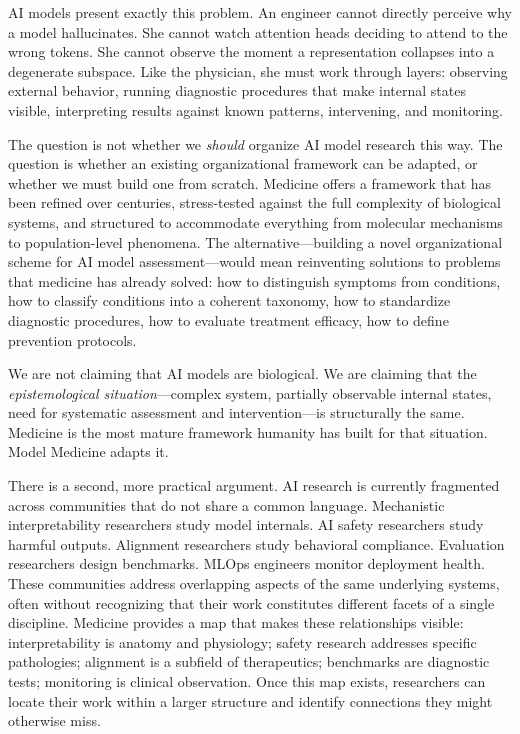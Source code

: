 \documentclass[11pt]{article}
\begin{document}
AI models present exactly this problem. An engineer cannot directly perceive why a model hallucinates. She cannot watch attention heads deciding to attend to the wrong tokens. She cannot observe the moment a representation collapses into a degenerate subspace. Like the physician, she must work through layers: observing external behavior, running diagnostic procedures that make internal states visible, interpreting results against known patterns, intervening, and monitoring.

The question is not whether we \emph{should} organize AI model research this way. The question is whether an existing organizational framework can be adapted, or whether we must build one from scratch. Medicine offers a framework that has been refined over centuries, stress-tested against the full complexity of biological systems, and structured to accommodate everything from molecular mechanisms to population-level phenomena. The alternative---building a novel organizational scheme for AI model assessment---would mean reinventing solutions to problems that medicine has already solved: how to distinguish symptoms from conditions, how to classify conditions into a coherent taxonomy, how to standardize diagnostic procedures, how to evaluate treatment efficacy, how to define prevention protocols.

We are not claiming that AI models are biological. We are claiming that the \emph{epistemological situation}---complex system, partially observable internal states, need for systematic assessment and intervention---is structurally the same. Medicine is the most mature framework humanity has built for that situation. Model Medicine adapts it.

There is a second, more practical argument. AI research is currently fragmented across communities that do not share a common language. Mechanistic interpretability researchers study model internals. AI safety researchers study harmful outputs. Alignment researchers study behavioral compliance. Evaluation researchers design benchmarks. MLOps engineers monitor deployment health. These communities address overlapping aspects of the same underlying systems, often without recognizing that their work constitutes different facets of a single discipline. Medicine provides a map that makes these relationships visible: interpretability is anatomy and physiology; safety research addresses specific pathologies; alignment is a subfield of therapeutics; benchmarks are diagnostic tests; monitoring is clinical observation. Once this map exists, researchers can locate their work within a larger structure and identify connections they might otherwise miss.
\end{document}
